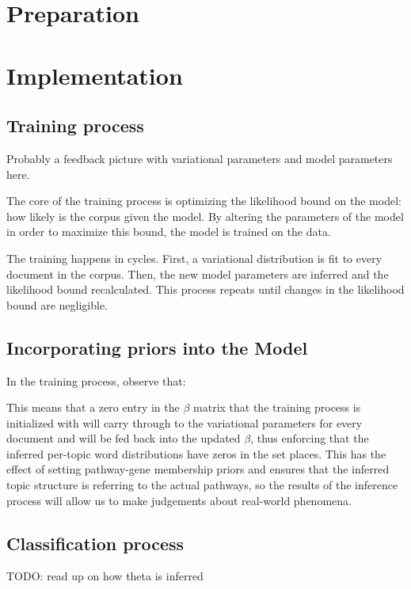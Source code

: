 \documentclass[12pt,a4paper,twoside,openright]{report}
\begin{document}
\chapter{Preparation}

\chapter{Implementation}

\section{Training process}

Probably a feedback picture with variational parameters and model parameters here.


The core of the training process is optimizing the likelihood bound on the model: how likely is the corpus given the model. By altering the parameters of the model in order to maximize this bound, the model is trained on the data.

The training happens in cycles. First, a variational distribution is fit to every document in the corpus. Then, the new model parameters are inferred and the likelihood bound recalculated. This process repeats until changes in the likelihood bound are negligible.

\section{Incorporating priors into the Model}

In the training process, observe that:

This means that a zero entry in the $\beta$ matrix that the training process is initialized with will carry through to the variational parameters for every document and will be fed back into the updated $\beta$, thus enforcing that the inferred per-topic word distributions have zeros in the set places. This has the effect of setting pathway-gene membership priors and ensures that the inferred topic structure is referring to the actual pathways, so the results of the inference process will allow us to make judgements about real-world phenomena.

\section{Classification process}

TODO: read up on how theta is inferred
\end{document}
